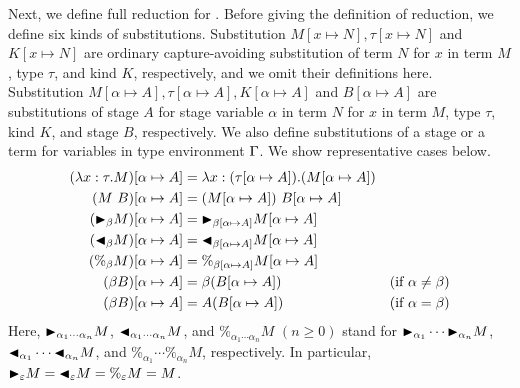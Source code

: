 Next, we define full reduction for \LMD.
Before giving the definition of reduction, we define six kinds of substitutions.
Substitution $M[x\mapsto N], \tau[x \mapsto N]$ and $K[x \mapsto N]$ are
ordinary capture-avoiding substitution of
term $N$ for $x$ in term $M$, type $\tau$, and kind $K$, respectively,
and we omit their definitions here.
Substitution $M[\alpha \mapsto A], \tau [\alpha \mapsto A], K[\alpha \mapsto A]$ and $B[\alpha\mapsto A]$ are
substitutions of stage $A$ for stage variable $\alpha$ in
term $N$ for $x$ in term $M$, type $\tau$, kind $K$, and stage $B$, respectively.
We also define substitutions of a stage or a term for variables in type environment $\Gamma$.
We show representative cases below.
%
{%
\begin{align*}
    (\lambda x:\tau.M)[\alpha \mapsto A] & = \lambda x:(\tau[\alpha \mapsto A]).(M[\alpha \mapsto A])                                  \\
    (M\ B)[\alpha \mapsto A]             & = (M[\alpha \mapsto A])\ B[\alpha\mapsto A]                                                 \\
    ({\mathop{\blacktriangleright}}_\beta M)[\alpha \mapsto A]      & = {\mathop{\blacktriangleright}}_{\beta[\alpha \mapsto A]}M[\alpha \mapsto A]                                          \\
    ({\mathop{\blacktriangleleft}}_\beta M)[\alpha \mapsto A]     & = {\mathop{\blacktriangleleft}}_{\beta[\alpha \mapsto A]}M[\alpha \mapsto A]                                         \\
    (\%_\beta M)[\alpha \mapsto A]       & = \%_{\beta[\alpha \mapsto A]}M[\alpha \mapsto A]                                           \\
    (\beta B)[\alpha \mapsto A]          & = \beta (B[\alpha\mapsto A])                               & (\text{if } \alpha \neq \beta) \\
    (\beta B)[\alpha \mapsto A]          & = A (B[\alpha\mapsto A])                                   & (\text{if } \alpha = \beta)
\end{align*}
}
Here, ${\mathop{\blacktriangleright}}_{\alpha_1\cdots\alpha_n} M$,
${\mathop{\blacktriangleleft}}_{\alpha_1\cdots\alpha_n} M$, and $\%_{\alpha_1\cdots\alpha_n} M$
$(n \geq 0)$ stand for ${\mathop{\blacktriangleright}}_{\alpha_1} \cdots {\mathop{\blacktriangleright}}_{\alpha_n} M$,
${\mathop{\blacktriangleleft}}_{\alpha_1}\cdots {\mathop{\blacktriangleleft}}_{\alpha_n} M$, and
$\%_{\alpha_1}\cdots \%_{\alpha_n} M$, respectively.  In particular,
${\mathop{\blacktriangleright}}_{\varepsilon} M = {\mathop{\blacktriangleleft}}_{\varepsilon} M = \%_{\varepsilon} M = M$.

